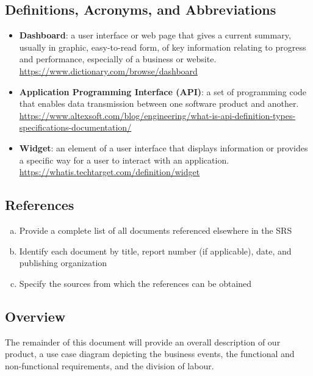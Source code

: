 \documentclass[]{article}
\begin{document}
\subsection{Definitions, Acronyms, and Abbreviations}
\label{sub:definitions_acronyms_and_abbreviations}
\begin{itemize}
  \item \textbf{Dashboard}: a user interface or web page that gives a current summary, usually in graphic, easy-to-read form, of key information relating to progress and performance, especially of a business or website. \url{https://www.dictionary.com/browse/dashboard}
  
  \item \textbf{Application Programming Interface (API)}: a set of programming code that enables data transmission between one software product and another. \url{https://www.altexsoft.com/blog/engineering/what-is-api-definition-types-specifications-documentation/}
  
    \item \textbf{Widget}: an element of a user interface that displays information or provides a specific way for a user to interact with an application. \url{https://whatis.techtarget.com/definition/widget}
\end{itemize}

\subsection{References}
\label{sub:references}
\begin{enumerate}[a)]
  \item Provide a complete list of all documents referenced elsewhere in the SRS
  \item Identify each document by title, report number (if applicable), date, and publishing organization
  \item Specify the sources from which the references can be obtained
\end{enumerate}

\subsection{Overview}
\label{sub:overview}
The remainder of this document will provide an overall description of our product, a use case diagram depicting the business events, the functional and non-functional requirements, and the division of labour. 
\begin{enumerate}[a)]

\end{enumerate}
\end{document}
